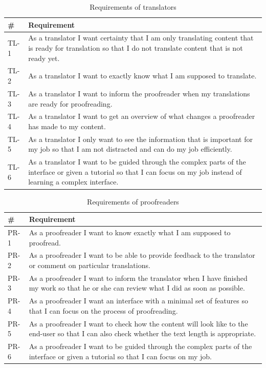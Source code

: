 \begin{table}[h!]
\centering
\begin{tabular}{|l|p{12cm}|}
\hline
\rowcolor[HTML]{EFEFEF}
\textbf{\#} & \textbf{Requirement} \\ \hline
TL-1 & As a translator I want certainty that I am only translating content that is ready for translation so that I do not translate content that is not ready yet. \\ \hline
TL-2 & As a translator I want to exactly know what I am supposed to translate. \\ \hline
TL-3 & As a translator I want to inform the proofreader when my translations are ready for proofreading. \\ \hline
TL-4 & As a translator I want to get an overview of what changes a proofreader has made to my content. \\ \hline
TL-5 & As a translator I only want to see the information that is important for my job so that I am not distracted and can do my job efficiently. \\ \hline
TL-6 & As a translator I want to be guided through the complex parts of the interface or given a tutorial so that I can focus on my job instead of learning a complex interface. \\ \hline
\end{tabular}
\caption{Requirements of translators}
\label{table:req-translators}
\end{table}


\begin{table}[h!]
\centering
\begin{tabular}{|l|p{12cm}|}
\hline
\rowcolor[HTML]{EFEFEF}
\textbf{\#} & \textbf{Requirement} \\ \hline
PR-1 & As a proofreader I want to know exactly what I am supposed to proofread. \\ \hline
PR-2 & As a proofreader I want to be able to provide feedback to the translator or comment on particular translations. \\ \hline
PR-3 & As a proofreader I want to inform the translator when I have finished my work so that he or she can review what I did as soon as possible. \\ \hline
PR-4 & As a proofreader I want an interface with a minimal set of features so that I can focus on the process of proofreading. \\ \hline
PR-5 & As a proofreader I want to check how the content will look like to the end-user so that I can also check whether the text length is appropriate. \\ \hline
PR-6 & As a proofreader I want to be guided through the complex parts of the interface or given a tutorial so that I can focus on my job. \\ \hline
\end{tabular}
\caption{Requirements of proofreaders}
\label{req-proofreaders}
\end{table}

